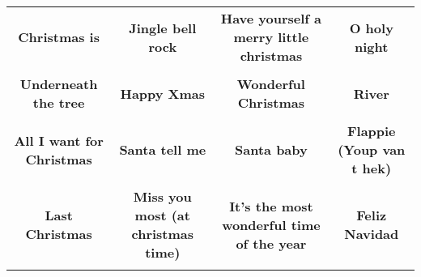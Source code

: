 \documentclass[12pt]{article} \usepackage{eso-pic, graphicx}
\newcommand{\background}[1]{%
\AddToShipoutPictureBG*{\texttt{[image: \#1]}}
}
\begin{document}
\tabcolsep=30.2pt \renewcommand{\arraystretch}{4.5}   \vspace*{4.3cm} \begin{center}  \begin{tabular}{c c c c}
\parbox{3cm}{\centering \textbf{Christmas is}}& 
\parbox{3cm}{\centering \textbf{Jingle bell rock}}& 
\parbox{3cm}{\centering \textbf{Have yourself a merry little christmas}}& 
\parbox{3cm}{\centering \textbf{O holy night}}\\ \\ 
\parbox{3cm}{\centering \textbf{Underneath the tree}}& 
\parbox{3cm}{\centering \textbf{Happy Xmas}}& 
\parbox{3cm}{\centering \textbf{Wonderful Christmas}}& 
\parbox{3cm}{\centering \textbf{River}}\\ \\ 
\parbox{3cm}{\centering \textbf{All I want for Christmas}}& 
\parbox{3cm}{\centering \textbf{Santa tell me}}& 
\parbox{3cm}{\centering \textbf{Santa baby}}& 
\parbox{3cm}{\centering \textbf{Flappie (Youp van t hek)}}\\ \\ 
\parbox{3cm}{\centering \textbf{Last Christmas}}& 
\parbox{3cm}{\centering \textbf{Miss you most (at christmas time)}}& 
\parbox{3cm}{\centering \textbf{It’s the most wonderful time of the year}}& 
\parbox{3cm}{\centering \textbf{Feliz Navidad}}\\ \\ 
\end{tabular} \background{discobingo.pdf} \end{center} 
\end{document}
